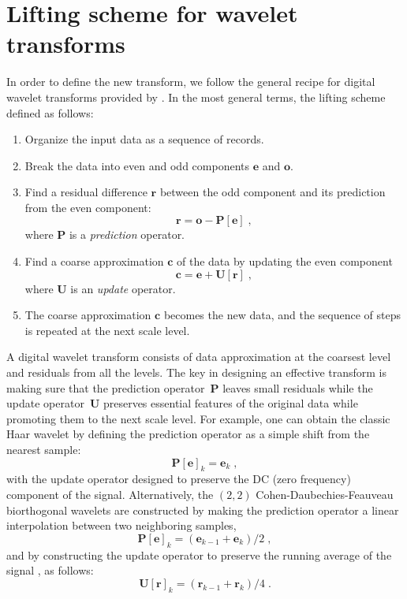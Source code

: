 \section{Lifting scheme for wavelet transforms}


In order to define the new transform, we follow the general recipe for
digital wavelet transforms provided by \cite{athome}. In the most
general terms, the lifting scheme \cite[]{lifting}   defined as follows:
\begin{enumerate}
\item Organize the input data as a sequence of records.
\item Break the data into even and odd components $\mathbf{e}$ and
  $\mathbf{o}$.
\item Find a residual difference $\mathbf{r}$ between the odd
  component and its prediction from the even component:
  \begin{equation}
    \label{eq:c}
    \mathbf{r}  = \mathbf{o} - \mathbf{P[e]}\;,
  \end{equation}
  where $\mathbf{P}$ is a \emph{prediction} operator.
\item Find a coarse approximation $\mathbf{c}$ of the data by updating 
      the even component
\begin{equation}
    \label{eq:r}
    \mathbf{c}  = \mathbf{e} + \mathbf{U[r]}\;,
  \end{equation}
  where $\mathbf{U}$ is an \emph{update} operator.
\item The coarse approximation $\mathbf{c}$ becomes the new data, 
and the sequence of steps is repeated at the next scale	level.
\end{enumerate}
A digital wavelet transform consists of data approximation at the
coarsest level and residuals from all the levels. The key in designing
an effective transform is making sure that the prediction
operator~$\mathbf{P}$ leaves small residuals while the update
operator~$\mathbf{U}$ preserves essential features of the original
data while promoting them to the next scale level.  For example, one
can obtain the classic Haar wavelet by defining the prediction
operator as a simple shift from the nearest sample:
\begin{equation}
  \label{eq:p1}
  \mathbf{P[e]}_k = \mathbf{e}_{k}\;,
\end{equation}
with the update operator designed to preserve the DC (zero frequency) component
of the signal. Alternatively, the $(2,2)$ Cohen-Daubechies-Feauveau
biorthogonal wavelets \cite[]{Cohen92} are constructed by making
the prediction operator a linear interpolation between two neighboring
samples,
\begin{equation}
  \label{eq:p}
  \mathbf{P[e]}_k = \left(\mathbf{e}_{k-1} + \mathbf{e}_{k}\right)/2\;,
\end{equation}
and by constructing the update operator to preserve the running
average of the signal \cite[]{athome}, as follows:
\begin{equation}
  \label{eq:u}
  \mathbf{U[r]}_k = \left(\mathbf{r}_{k-1} + \mathbf{r}_{k}\right)/4\;.
\end{equation}

